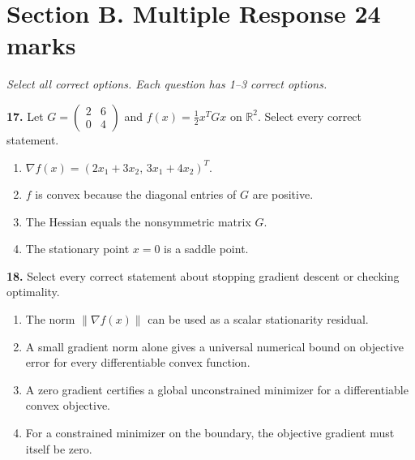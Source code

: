 \documentclass[11pt,a4paper]{article}
\begin{document}
\newpage\section*{Section B. Multiple Response \hfill 24 marks}
\textit{Select all correct options. Each question has 1--3 correct options.}\par
\par\noindent\begin{minipage}{\linewidth}
\textbf{17.} Let \(G=\begin{pmatrix}2&6\\0&4\end{pmatrix}\) and \(f(x)=\tfrac12x^TGx\) on \(\mathbb R^2\). Select every correct statement.
\begin{enumerate}[label=(\Alph*),leftmargin=8mm,itemsep=2pt,topsep=2pt]
\item \(\nabla f(x)=(2x_1+3x_2,\,3x_1+4x_2)^T\).
\item \(f\) is convex because the diagonal entries of \(G\) are positive.
\item The Hessian equals the nonsymmetric matrix \(G\).
\item The stationary point \(x=0\) is a saddle point.
\end{enumerate}

\end{minipage}\par\vspace{3mm}
\par\noindent\begin{minipage}{\linewidth}
\textbf{18.} Select every correct statement about stopping gradient descent or checking optimality.
\begin{enumerate}[label=(\Alph*),leftmargin=8mm,itemsep=2pt,topsep=2pt]
\item The norm \(\|\nabla f(x)\|\) can be used as a scalar stationarity residual.
\item A small gradient norm alone gives a universal numerical bound on objective error for every differentiable convex function.
\item A zero gradient certifies a global unconstrained minimizer for a differentiable convex objective.
\item For a constrained minimizer on the boundary, the objective gradient must itself be zero.
\end{enumerate}

\end{minipage}\par\vspace{3mm}
\end{document}

